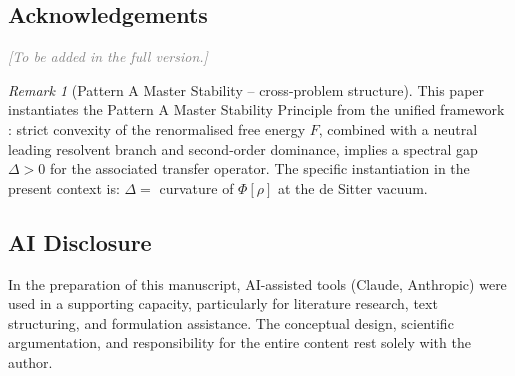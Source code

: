 \documentclass[12pt,a4paper]{article}
\theoremstyle{definition}
\theoremstyle{plain}
\theoremstyle{remark}
\newtheorem{remark}[definition]{Remark}
\begin{document}
\subsection*{Acknowledgements}

\textcolor{gray}{\textit{[To be added in the full version.]}}

\begin{remark}[Pattern A Master Stability -- cross-problem structure]
This paper instantiates the Pattern A Master Stability Principle from the unified framework \cite{FST-Unified2026}: strict convexity of the renormalised free energy $F$, combined with a neutral leading resolvent branch and second-order dominance, implies a spectral gap $\Delta > 0$ for the associated transfer operator. The specific instantiation in the present context is: $\Delta = $ curvature of $\Phi[\rho]$ at the de Sitter vacuum.
\end{remark}

\subsection*{AI Disclosure}
In the preparation of this manuscript, AI-assisted tools (Claude, Anthropic)
were used in a supporting capacity, particularly for literature research,
text structuring, and formulation assistance.  The conceptual design,
scientific argumentation, and responsibility for the entire content
rest solely with the author.
\end{document}
